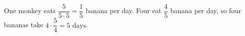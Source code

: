 One monkey eats $\dfrac{5}{5\cdot5}=\dfrac{1}{5}$ banana per day. Four eat $\dfrac{4}{5}$ banana per day, so four bananas take $4\cdot\dfrac{5}{4}=\boxed{5\text{ days}}$.
